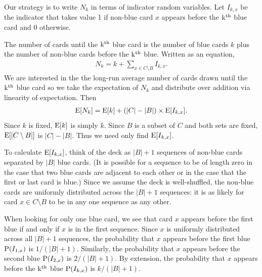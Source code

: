 Our strategy is to write $N_k$ in terms of
indicator random variables.
Let $I_{k,x}$ be the indicator that takes value 1
if non-blue card $x$ appears before the $\operatorname{k^{th}}$ blue card
and 0 otherwise.

The number of cards until the $\operatorname{k^{th}}$ blue card
is the number of blue cards $k$
plus the number of non-blue cards before the $\operatorname{k^{th}}$ blue.
Written as an equation,
\begin{align}
    N_k = k + \sum_{x \in C \setminus B} I_{k,x}. \nonumber
\end{align}
We are interested in the the long-run average number of 
cards drawn until the $\operatorname{k^{th}}$ blue card
so we take the expectation of $N_k$ and distribute
over addition via linearity of expectation.
Then
\begin{align} \label{eq:expected_card}
    \operatorname{\mathrm{E}}[N_k] = \operatorname{\mathrm{E}}[k] + 
    \left( |C| - |B| \right) \times \operatorname{\mathrm{E}}[I_{k,x}].
\end{align}
Since $k$ is fixed, $\operatorname{\mathrm{E}}[k]$ is simply $k$.
Since $B$ is a subset of $C$ and both sets are fixed,
$\operatorname{\mathrm{E}}[|C \setminus B|]$ is $|C| - |B|$.
Thus we need only find $\operatorname{\mathrm{E}}[I_{k,x}]$.

To calculate $\operatorname{\mathrm{E}}[I_{k,x}]$, think of the deck as $|B| + 1$ sequences 
of non-blue cards separated by $|B|$ blue cards.
(It is possible for a sequence to be of length zero
in the case that two blue cards are adjacent to each other or
in the case that the first or last card is blue.)
Since we assume the deck is well-shuffled, the non-blue cards
are uniformly distributed across the $|B| + 1$ sequences:
it is as likely for card $x \in C \setminus B$ to be in any one sequence
as any other.

When looking for only one blue card,
we see that card $x$ appears before the first blue if and only if
$x$ is in the first sequence.
Since $x$ is uniformly distributed across all $|B| + 1$ sequences,
the probability that $x$ appears before the first blue $\operatorname{\mathrm{P}}(I_{1,x})$
is $1/(|B| + 1)$.
Similarly, the probability that $x$ appears before the second blue
$\operatorname{\mathrm{P}}(I_{2,x})$ is $2/(|B| + 1)$.
By extension, the probability that $x$
appears before the $\operatorname{k^{th}}$ blue
$\operatorname{\mathrm{P}}(I_{k,x})$ is $k/(|B| + 1)$.

